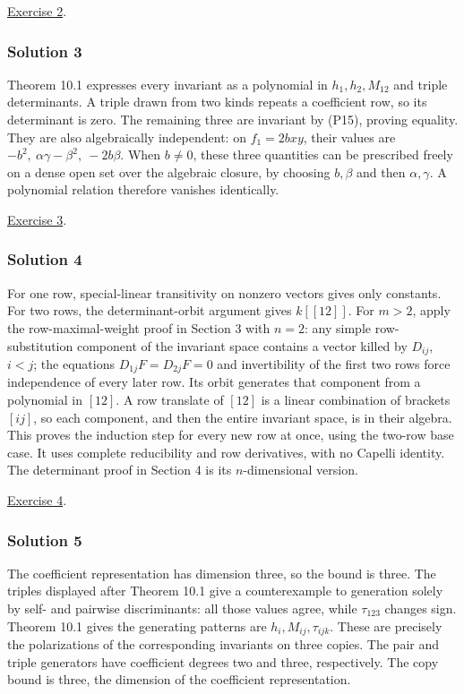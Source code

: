 \documentclass[
]{article}
\begin{document}
\hyperref[exercise-2]{Exercise 2}.

\subsubsection{Solution 3}\label{solution-3}

Theorem 10.1 expresses every invariant as a polynomial in
\(h_1,h_2,M_{12}\) and triple determinants. A triple drawn from two
kinds repeats a coefficient row, so its determinant is zero. The
remaining three are invariant by (P15), proving equality. They are also
algebraically independent: on \(f_1=2bxy\), their values are
\(-b^2,\ \alpha\gamma-\beta^2,\ -2b\beta\). When \(b\ne0\), these three
quantities can be prescribed freely on a dense open set over the
algebraic closure, by choosing \(b,\beta\) and then \(\alpha,\gamma\). A
polynomial relation therefore vanishes identically.

\hyperref[exercise-3]{Exercise 3}.

\subsubsection{Solution 4}\label{solution-4}

For one row, special-linear transitivity on nonzero vectors gives only
constants. For two rows, the determinant-orbit argument gives
\(k [[12]]\). For \(m>2\), apply the row-maximal-weight proof in Section
3 with \(n=2\): any simple row-substitution component of the invariant
space contains a vector killed by \(D_{ij}\), \(i<j\); the equations
\(D_{1j}F=D_{2j}F=0\) and invertibility of the first two rows force
independence of every later row. Its orbit generates that component from
a polynomial in \([12]\). A row translate of \([12]\) is a linear
combination of brackets \([ij]\), so each component, and then the entire
invariant space, is in their algebra. This proves the induction step for
every new row at once, using the two-row base case. It uses complete
reducibility and row derivatives, with no Capelli identity. The
determinant proof in Section 4 is its \(n\)-dimensional version.

\hyperref[exercise-4]{Exercise 4}.

\subsubsection{Solution 5}\label{solution-5}

The coefficient representation has dimension three, so the bound is
three. The triples displayed after Theorem 10.1 give a counterexample to
generation solely by self- and pairwise discriminants: all those values
agree, while \(\tau_{123}\) changes sign. Theorem 10.1 gives the
generating patterns are \(h_i,M_{ij},\tau_{ijk}\). These are precisely
the polarizations of the corresponding invariants on three copies. The
pair and triple generators have coefficient degrees two and three,
respectively. The copy bound is three, the dimension of the coefficient
representation.
\end{document}
